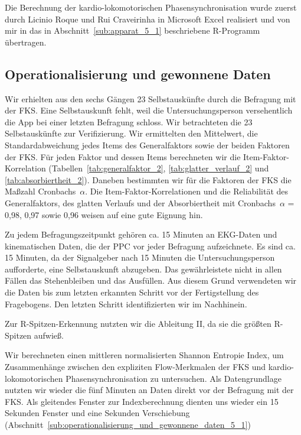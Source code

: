 Die Berechnung der kardio-lokomotorischen Phasensynchronisation wurde zuerst durch Licinio Roque und Rui Craveirinha in Microsoft Excel realisiert und von mir in das in Abschnitt~\ref{sub:apparat_5_1} beschriebene R-Programm übertragen. 

\subsection{Operationalisierung und gewonnene Daten} 

\label{sub:operationalisierung_und_gewonnene_daten_5_2}

Wir erhielten aus den sechs Gängen 23 Selbstauskünfte durch die Befragung mit der \ac{FKS}. Eine Selbstauskunft fehlt, weil die Untersuchungsperson versehentlich die App bei einer letzten Befragung schloss. Wir betrachteten die 23 Selbstauskünfte zur Verifizierung. Wir ermittelten den Mittelwert, die Standardabweichung jedes Items des Generalfaktors sowie der beiden Faktoren der \ac{FKS}. Für jeden Faktor und dessen Items berechneten wir die Item-Faktor-Korrelation (Tabellen~\ref{tab:generalfaktor_2}, \ref{tab:glatter_verlauf_2} und \ref{tab:absorbiertheit_2}). Daneben bestimmten wir für die Faktoren der \ac{FKS} die Maßzahl Cronbachs~$\alpha$. Die Item-Faktor-Korrelationen und die Reliabilität des Generalfaktors, des glatten Verlaufs und der Absorbiertheit mit Cronbachs~$\alpha$ = 0,98, 0,97 sowie 0,96 weisen auf eine gute Eignung hin. 

Zu jedem Befragungszeitpunkt gehören ca. 15 Minuten an \ac{EKG}-Daten und kinematischen Daten, die der \ac{PPC} vor jeder Befragung aufzeichnete. Es sind ca. 15 Minuten, da der Signalgeber nach 15 Minuten die Untersuchungsperson aufforderte, eine Selbstauskunft abzugeben. Das gewährleistete nicht in allen Fällen das Stehenbleiben und das Ausfüllen. Aus diesem Grund verwendeten wir die Daten bis zum letzten erkannten Schritt vor der Fertigstellung des Fragebogens. Den letzten Schritt identifizierten wir im Nachhinein. 

Zur R-Spitzen-Erkennung nutzten wir die Ableitung II, da sie die größten R-Spitzen aufwieß. 

Wir berechneten einen mittleren normalisierten Shannon Entropie Index, um Zusammenhänge zwischen den expliziten Flow-Merkmalen der \ac{FKS} und kardio-lokomotorischen Phasensynchronisation zu untersuchen. Als Datengrundlage nutzten wir wieder die fünf Minuten an Daten direkt vor der Befragung mit der \ac{FKS}. Als gleitendes Fenster zur Indexberechnung dienten uns wieder ein 15 Sekunden Fenster und eine Sekunden Verschiebung (Abschnitt~\ref{sub:operationalisierung_und_gewonnene_daten_5_1})

